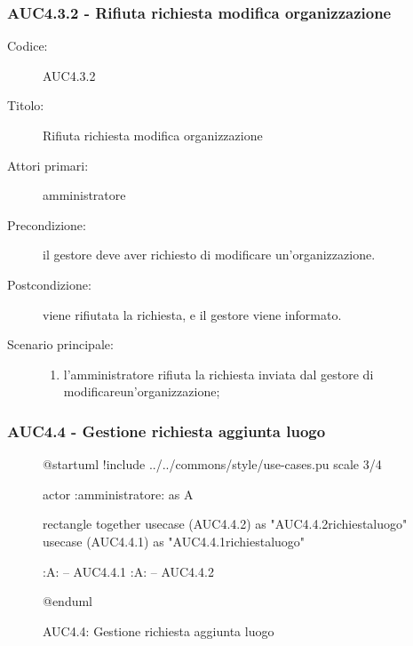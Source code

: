 \documentclass[casi-duso]{subfiles}
\begin{document}
\subsubsection{AUC4.3.2 - Rifiuta richiesta modifica organizzazione}%
\label{subsub:AUC4.3.2}
\begin{description}
  \item[Codice:] AUC4.3.2
  \item[Titolo:] Rifiuta richiesta modifica organizzazione
  \item[Attori primari:] amministratore
  \item[Precondizione:] il gestore deve aver richiesto di modificare un'organizzazione.
  \item[Postcondizione:] viene rifiutata la richiesta, e il gestore viene informato.
  \item[Scenario principale:]
  \begin{enumerate}
    \item l'amministratore rifiuta la richiesta inviata dal gestore di modificareun'organizzazione;
  \end{enumerate}
\end{description}

\subsubsection{AUC4.4 - Gestione richiesta aggiunta luogo}%
\label{subsub:AUC4.4}

\begin{figure}[h!]
  \centering
  \begin{plantuml}
  @startuml
  !include ../../commons/style/use-cases.pu
  scale 3/4

  actor :amministratore: as A

  rectangle {
    together {
      usecase (AUC4.4.2) as "AUC4.4.2\nRifiuta richiesta\naggiungi luogo"
      usecase (AUC4.4.1) as "AUC4.4.1\nAccetta richiesta\naggiungi luogo"
    }
  }

  :A: -- AUC4.4.1
  :A: -- AUC4.4.2

  @enduml
  \end{plantuml}
  \caption{AUC4.4: Gestione richiesta aggiunta luogo}
  \label{fig:auc4_4}
\end{figure}
\end{document}
